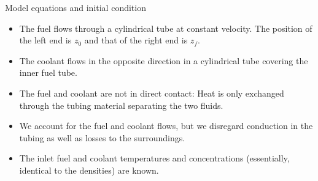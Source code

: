 \begin{frame}{Model equations and initial condition}
	\begin{scriptsize}
		\begin{itemize}
			\item The fuel flows through a cylindrical tube at constant velocity. The position of the left end is $z_0$ and that of the right end is $z_f$.
			\item The coolant flows in the opposite direction in a cylindrical tube covering the inner fuel tube.
			\item The fuel and coolant are not in direct contact: Heat is only exchanged through the tubing material separating the two fluids.
			\item We account for the fuel and coolant flows, but we disregard conduction in the tubing as well as losses to the surroundings.
			\item The inlet fuel and coolant temperatures and concentrations (essentially, identical to the densities) are known.
		\end{itemize}
	\end{scriptsize}
\end{frame}

